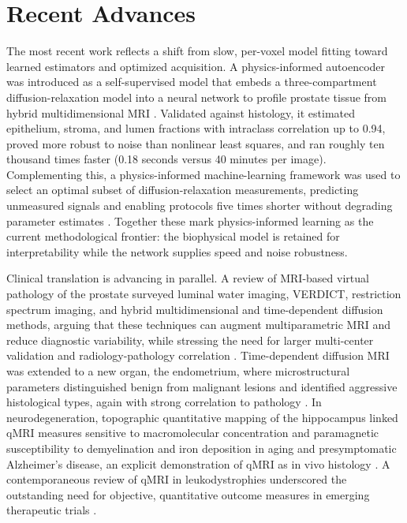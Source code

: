 \documentclass[sn-mathphys,Numbered]{sn-jnl}
\begin{document}
\section{Recent Advances}\label{sec:recent}
The most recent work reflects a shift from slow, per-voxel model fitting toward learned estimators and optimized acquisition.
A physics-informed autoencoder was introduced as a self-supervised model that embeds a three-compartment diffusion-relaxation model into a neural network to profile prostate tissue from hybrid multidimensional MRI \cite{pmid39907585}.
Validated against histology, it estimated epithelium, stroma, and lumen fractions with intraclass correlation up to 0.94, proved more robust to noise than nonlinear least squares, and ran roughly ten thousand times faster (0.18 seconds versus 40 minutes per image).
Complementing this, a physics-informed machine-learning framework was used to select an optimal subset of diffusion-relaxation measurements, predicting unmeasured signals and enabling protocols five times shorter without degrading parameter estimates \cite{pmid38471339}.
Together these mark physics-informed learning as the current methodological frontier: the biophysical model is retained for interpretability while the network supplies speed and noise robustness.

Clinical translation is advancing in parallel.
A review of MRI-based virtual pathology of the prostate surveyed luminal water imaging, VERDICT, restriction spectrum imaging, and hybrid multidimensional and time-dependent diffusion methods, arguing that these techniques can augment multiparametric MRI and reduce diagnostic variability, while stressing the need for larger multi-center validation and radiology-pathology correlation \cite{pmid38856839}.
Time-dependent diffusion MRI was extended to a new organ, the endometrium, where microstructural parameters distinguished benign from malignant lesions and identified aggressive histological types, again with strong correlation to pathology \cite{pmid41015861}.
In neurodegeneration, topographic quantitative mapping of the hippocampus linked qMRI measures sensitive to macromolecular concentration and paramagnetic susceptibility to demyelination and iron deposition in aging and presymptomatic Alzheimer's disease, an explicit demonstration of qMRI as in vivo histology \cite{pmid41144662}.
A contemporaneous review of qMRI in leukodystrophies underscored the outstanding need for objective, quantitative outcome measures in emerging therapeutic trials \cite{pmid37150021}.
\end{document}
